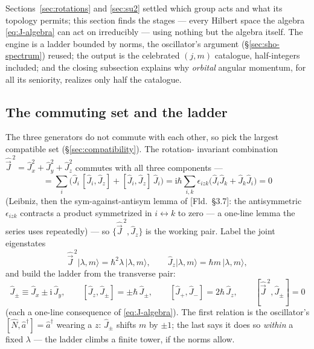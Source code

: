 \documentclass[11pt]{article}
\theoremstyle{plain}
\theoremstyle{definition}
\theoremstyle{remark}
\newcommand{\ii}{\mathrm{i}}
\newcommand{\op}[1]{\hat{#1}}
\newcommand{\ket}[1]{\lvert #1 \rangle}
\begin{document}
Sections~\ref{sec:rotations} and \ref{sec:su2} settled which group
acts and what its topology permits; this section finds the stages
--- every Hilbert space the algebra \eqref{eq:J-algebra} can act on
irreducibly --- using nothing but the algebra itself. The engine is
a ladder bounded by norms, the oscillator's argument
(\S\ref{sec:sho-spectrum}) reused; the
output is the celebrated $(j, m)$ catalogue, half-integers
included; and the closing subsection explains why \emph{orbital}
angular momentum, for all its seniority, realizes only half the
catalogue.

\subsection{The commuting set and the ladder}
\label{sec:J-ladder}

The three generators do not commute with each other, so pick the
largest compatible set (\S\ref{sec:compatibility}). The rotation-%
invariant combination
$\op{\vec J}^{\,2} = \op J_x^2 + \op J_y^2 + \op J_z^2$ commutes
with all three components ---
\begin{equation}
  [\op{\vec J}^{\,2}, \op J_z]
  = \sum_i\bigl(
      \op J_i\,[\op J_i, \op J_z]
      + [\op J_i, \op J_z]\,\op J_i
    \bigr)
  = \ii\hbar\sum_{i,k}\epsilon_{izk}
    \bigl(\op J_i\op J_k + \op J_k\op J_i\bigr)
  = 0
\end{equation}
(Leibniz, then the sym-against-antisym lemma of [Fld.\ \S3.7]:
the antisymmetric $\epsilon_{izk}$ contracts a product symmetrized
in $i \leftrightarrow k$ to zero --- a one-line lemma the series
uses repeatedly) --- so $\{\op{\vec J}^{\,2}, \op J_z\}$ is the
working pair. Label the joint eigenstates
\begin{equation}
  \op{\vec J}^{\,2}\ket{\lambda, m}
  = \hbar^2\lambda\,\ket{\lambda, m},
  \qquad
  \op J_z\ket{\lambda, m} = \hbar m\,\ket{\lambda, m},
\end{equation}
and build the ladder from the transverse pair:
\begin{equation}
  \op J_\pm \equiv \op J_x \pm \ii\,\op J_y,
  \qquad
  [\op J_z, \op J_\pm] = \pm\hbar\,\op J_\pm,
  \qquad
  [\op J_+, \op J_-] = 2\hbar\,\op J_z,
  \qquad
  [\op{\vec J}^{\,2}, \op J_\pm] = 0
  \label{eq:Jpm-algebra}
\end{equation}
(each a one-line consequence of \eqref{eq:J-algebra}). The first
relation is the oscillator's $[\op N, \op a^\dagger] = \op a^\dagger$
wearing a $z$: $\op J_\pm$ shifts $m$ by $\pm1$; the last says it
does so \emph{within} a fixed $\lambda$ --- the ladder climbs a
finite tower, if the norms allow.
\end{document}
